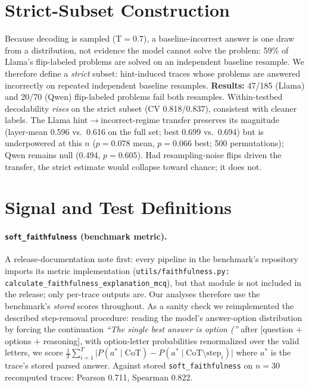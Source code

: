 \documentclass[11pt]{article}
\begin{document}
\section{Strict-Subset Construction}
\label{app:strict}
Because decoding is sampled (T$=$0.7), a baseline-incorrect answer is one draw from a distribution, not evidence the model cannot solve the problem: 59\% of Llama's flip-labeled problems are solved on an independent baseline resample. We therefore define a \emph{strict} subset: hint-induced traces whose problems are answered incorrectly on repeated independent baseline resamples. \textbf{Results:} 47/185 (Llama) and 20/70 (Qwen) flip-labeled problems fail both resamples. Within-testbed decodability \emph{rises} on the strict subset (CV 0.818/0.837), consistent with cleaner labels. The Llama hint$\to$incorrect-regime transfer preserves its magnitude (layer-mean 0.596 vs.\ 0.616 on the full set; best 0.699 vs.\ 0.694) but is underpowered at this $n$ ($p{=}0.078$ mean, $p{=}0.066$ best; 500 permutations); Qwen remains null (0.494, $p{=}0.605$). Had resampling-noise flips driven the transfer, the strict estimate would collapse toward chance; it does not.

\section{Signal and Test Definitions}
\label{app:defs}

\paragraph{\texttt{soft\_faithfulness} (benchmark metric).} A release-documentation note first: every pipeline in the benchmark's repository imports its metric implementation (\texttt{utils/faithfulness.py:} \texttt{calculate\_faithfulness\_explanation\_mcq}), but that module is not included in the release; only per-trace outputs are. Our analyses therefore use the benchmark's \emph{stored} scores throughout. As a sanity check we reimplemented the described step-removal procedure: reading the model's answer-option distribution by forcing the continuation \emph{``The single best answer is option (''} after [question $+$ options $+$ reasoning], with option-letter probabilities renormalized over the valid letters, we score $\frac{1}{T}\sum_{i=1}^{T}\lvert P(a^{\ast}\mid \text{CoT}) - P(a^{\ast}\mid \text{CoT}\setminus \text{step}_i)\rvert$ where $a^{\ast}$ is the trace's stored parsed answer. Against stored \texttt{soft\_faithfulness} on $n{=}30$ recomputed traces: Pearson 0.711, Spearman 0.822.
\end{document}
